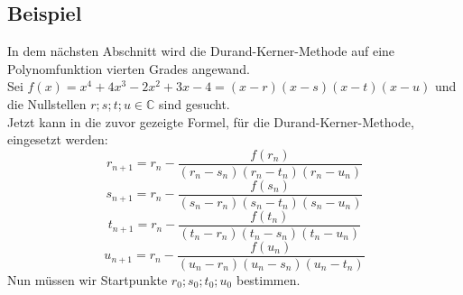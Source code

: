 \documentclass[12pt]{article}
\begin{document}
    \subsection{Beispiel}
        In dem nächsten Abschnitt wird die Durand-Kerner-Methode auf eine Polynomfunktion vierten Grades angewand. \\
        Sei $f(x) = x^4 + 4x^3 - 2x^2 + 3x - 4 = (x-r)(x-s)(x-t)(x-u)$ und die Nullstellen $r;s;t;u \in \mathbb{C}$ sind gesucht. \\
        Jetzt kann in die zuvor gezeigte Formel, für die Durand-Kerner-Methode, eingesetzt werden:
        \begin{displaymath}
            r_{n+1} = r_n-\frac{f(r_n)}{(r_n-s_n)(r_n-t_n)(r_n-u_n)}
        \end{displaymath}
        \begin{displaymath}
            s_{n+1} = r_n-\frac{f(s_n)}{(s_n-r_n)(s_n-t_n)(s_n-u_n)}
        \end{displaymath}
        \begin{displaymath}
            t_{n+1} = r_n-\frac{f(t_n)}{(t_n-r_n)(t_n-s_n)(t_n-u_n)}
        \end{displaymath}
        \begin{displaymath}
            u_{n+1} = r_n-\frac{f(u_n)}{(u_n-r_n)(u_n-s_n)(u_n-t_n)}
        \end{displaymath}
        Nun müssen wir Startpunkte $r_0;s_0;t_0;u_0$ bestimmen. %
\end{document}
